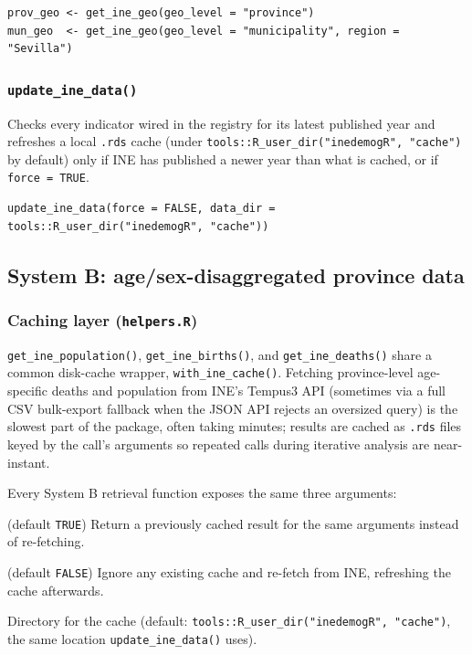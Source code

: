 \documentclass[11pt]{article}
\newcommand{\fn}[1]{\texttt{#1}}
\begin{document}
\begin{lstlisting}
prov_geo <- get_ine_geo(geo_level = "province")
mun_geo  <- get_ine_geo(geo_level = "municipality", region = "Sevilla")
\end{lstlisting}

\subsubsection{\fn{update\_ine\_data()}}

Checks every indicator wired in the registry for its latest published year
and refreshes a local \fn{.rds} cache (under
\fn{tools::R\_user\_dir("inedemogR", "cache")} by default) only if INE has
published a newer year than what is cached, or if \fn{force = TRUE}.

\begin{lstlisting}
update_ine_data(force = FALSE, data_dir = tools::R_user_dir("inedemogR", "cache"))
\end{lstlisting}

\subsection{System B: age/sex-disaggregated province data}

\subsubsection{Caching layer (\fn{helpers.R})}
\label{sec:caching}

\fn{get\_ine\_population()}, \fn{get\_ine\_births()}, and
\fn{get\_ine\_deaths()} share a common disk-cache wrapper,
\fn{with\_ine\_cache()}. Fetching province-level age-specific deaths and
population from INE's Tempus3 API (sometimes via a full CSV bulk-export
fallback when the JSON API rejects an oversized query) is the slowest part
of the package, often taking minutes; results are cached as \fn{.rds} files
keyed by the call's arguments so repeated calls during iterative analysis
are near-instant.

Every System B retrieval function exposes the same three arguments:

\begin{description}[leftmargin=2.2cm,style=nextline]
  \item[use\_cache] (default \fn{TRUE}) Return a previously cached result
    for the same arguments instead of re-fetching.
  \item[force] (default \fn{FALSE}) Ignore any existing cache and re-fetch
    from INE, refreshing the cache afterwards.
  \item[cache\_dir] Directory for the cache (default:
    \fn{tools::R\_user\_dir("inedemogR", "cache")}, the same location
    \fn{update\_ine\_data()} uses).
\end{description}
\end{document}
